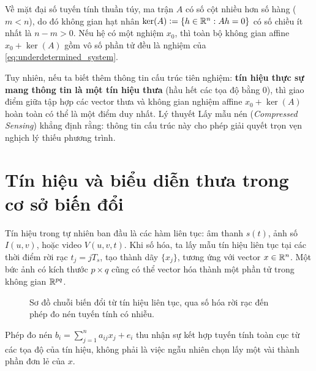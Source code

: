 Về mặt đại số tuyến tính thuần túy, ma trận $A$ có số cột nhiều hơn số hàng ($m < n$), do đó không gian hạt nhân $\ker(A) \mathrel{\mathop:}= \{h \in \mathbb{R}^n : Ah = 0\}$ có số chiều ít nhất là $n - m > 0$. Nếu hệ có một nghiệm $x_0$, thì toàn bộ không gian affine $x_0 + \ker(A)$ gồm vô số phần tử đều là nghiệm của \eqref{eq:underdetermined_system}. 

Tuy nhiên, nếu ta biết thêm thông tin cấu trúc tiên nghiệm: \textbf{tín hiệu thực sự mang thông tin là một tín hiệu thưa} (hầu hết các tọa độ bằng 0), thì giao điểm giữa tập hợp các vector thưa và không gian nghiệm affine $x_0 + \ker(A)$ hoàn toàn có thể là một điểm duy nhất. Lý thuyết Lấy mẫu nén (\emph{Compressed Sensing}) \cite{donoho2006compressed, candes2006stable} khẳng định rằng: thông tin cấu trúc này cho phép giải quyết trọn vẹn nghịch lý thiếu phương trình.

\section{Tín hiệu và biểu diễn thưa trong cơ sở biến đổi}
Tín hiệu trong tự nhiên ban đầu là các hàm liên tục: âm thanh $s(t)$, ảnh số $I(u, v)$, hoặc video $V(u, v, t)$. Khi số hóa, ta lấy mẫu tín hiệu liên tục tại các thời điểm rời rạc $t_j = j T_s$, tạo thành dãy $\{x_j\}$, tương ứng với vector $x \in \mathbb{R}^n$. Một bức ảnh có kích thước $p \times q$ cũng có thể vector hóa thành một phần tử trong không gian $\mathbb{R}^{pq}$.

\begin{figure}[htbp]
    \centering
    \caption{Sơ đồ chuỗi biến đổi từ tín hiệu liên tục, qua số hóa rời rạc đến phép đo nén tuyến tính có nhiễu.}
    \label{fig:sampling_process}
\end{figure}

Phép đo nén $b_i = \sum_{j=1}^n a_{ij} x_j + e_i$ thu nhận sự kết hợp tuyến tính toàn cục từ các tọa độ của tín hiệu, không phải là việc ngẫu nhiên chọn lấy một vài thành phần đơn lẻ của $x$.

